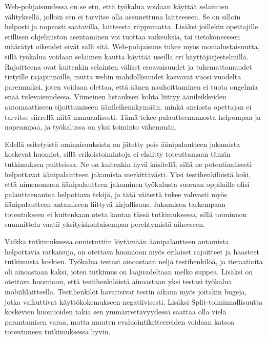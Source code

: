 \documentclass[utf8]{gradu3}
\begin{document}
Web-pohjaisuudessa on se etu, että työkalua voidaan käyttää selaimien välityksellä, jolloin sen ei tarvitse olla asennettuna laitteeseen. Se on silloin helposti ja nopeasti saatavilla, laitteesta riippumatta. Lisäksi joillekin opettajille erillisen ohjelmiston asentaminen voi tuottaa vaikeuksia, tai tietokoneeseen määrätyt oikeudet eivät salli sitä. Web-pohjaisuus tukee myös monialustaisuutta, sillä työkalua voidaan selaimen kautta käyttää useilla eri käyttöjärjestelmillä. Rajoitteena ovat kuitenkin selainten väliset eroavaisuudet ja tukemattomuudet tietyille rajapinnoille, mutta webin mahdollisuudet kasvavat vuosi vuodelta paremmiksi, joten voidaan olettaa, että äänen nauhoittaminen ei tuota ongelmia enää tulevaisuudessa. Viimeinen listauksen kohta liittyy äänileikkeiden automaattiseen sijoittumiseen äänileikenäkymään, minkä ansiosta opettajan ei tarvitse siirrellä niitä manuaalisesti. Tämä tekee palautteenannosta helpompaa ja nopeampaa, ja työkalussa on yksi toiminto vähemmän.  

Edellä esitetyistä ominaisuuksista on jätetty pois äänipalautteen jakamista koskevat huomiot, sillä erikoistoimintoja ei ehditty toteuttamaan tämän tutkimuksen puitteissa. Ne on kuitenkin hyvä käsitellä, sillä ne potentiaalisesti helpottavat äänipalautteen jakamista merkittävästi. Yksi testihenkilöistä koki, että nimenomaan äänipalautteen jakaminen työkalusta suoraan oppilaille olisi palautteenantoa helpottava tekijä, ja tätä väitettä tukee vahvasti myös äänipalautteen antamiseen liittyvä kirjallisuus. Jakamisen tarkempaan toteutukseen ei kuitenkaan oteta kantaa tässä tutkimuksessa, sillä toiminnon suunnittelu vaatii yksityiskohtaisempaa perehtymistä aiheeseen.

Vaikka tutkimuksessa onnistuttiin löytämään äänipalautteen antamista helpottavia ratkaisuja, on otettava huomioon myös erilaiset rajoitteet ja haasteet tutkimusta koskien. Työkalua testasi ainoastaan neljä testihenkilöä, ja iteraatioita oli ainoastaan kaksi, joten tutkimus on laajuudeltaan melko suppea. Lisäksi on otettava huomioon, että testihenkilöistä ainoastaan yksi testasi työkalua mobiililaitteella. Testihenkilöt havaitsivat testin aikana myös joitakin bugeja, jotka vaikuttivat käyttökokemukseen negatiivisesti. Lisäksi Split-toiminnallisuutta koskevien huomioiden takia sen ymmärrettävyydessä saattaa olla vielä parantamisen varaa, mutta muuten evaluointikriteereiden voidaan katsoa toteutuneen tutkimuksessa hyvin.
\end{document}
